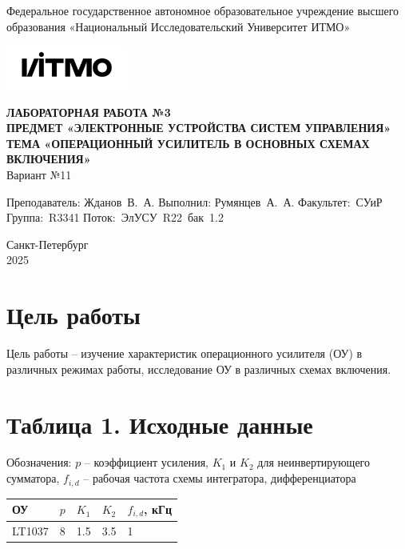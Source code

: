 \documentclass[a4paper, 12pt]{article}
\begin{document}
    \begin{titlepage}

        \begin{center}
        Федеральное государственное автономное образовательное учреждение высшего образования
        «Национальный Исследовательский Университет ИТМО»
        \vfill
        
        \includegraphics[width=0.3\textwidth]{itmo.png} %

        {\large\bf ЛАБОРАТОРНАЯ РАБОТА №3}\\
        {\large\bf ПРЕДМЕТ «ЭЛЕКТРОННЫЕ УСТРОЙСТВА СИСТЕМ УПРАВЛЕНИЯ»}\\
        {\large\bf ТЕМА «ОПЕРАЦИОННЫЙ УСИЛИТЕЛЬ В ОСНОВНЫХ СХЕМАХ ВКЛЮЧЕНИЯ»}\\
        Вариант №11
        \vfill

        \begin{flushright}
            \begin{minipage}{.45\textwidth}
            {
                \hbox{Преподаватель:}
                \hbox{Жданов В. А.}
                \hbox{}
                \hbox{Выполнил:}
                \hbox{Румянцев А. А.}
                \hbox{}
                \hbox{Факультет: СУиР}
                \hbox{Группа: R3341}
                \hbox{Поток: ЭлУСУ R22 бак 1.2}
            }
            \end{minipage}
        \end{flushright}
        \vfill
  
        Санкт-Петербург\\
        2025
        \end{center}
    \end{titlepage}
    
    \tableofcontents

    \newpage
    \section{Цель работы}
    Цель работы -- изучение характеристик операционного усилителя
    (ОУ) в различных режимах работы, исследование ОУ в различных схемах включения.

    
    \section{Таблица 1. Исходные данные}
    Обозначения: $p$ -- коэффициент усиления, $K_1$ и $K_2$ для неинвертирующего сумматора,
    $f_{i,d}$ -- рабочая частота схемы интегратора, дифференциатора
    \begin{center}
        \begin{tabular}{ | m{4em} | m{4em}| m{4em} | m{4em} | m{4em} | } 
        \hline
        ОУ& $p$ &$K_1$ &$K_2$ &$f_{i,d}$, кГц\\ 
        \hline
        LT1037& 8 & 1.5 &3.5 &1\\ 
        \hline
        \end{tabular}
    \end{center}
\end{document}
